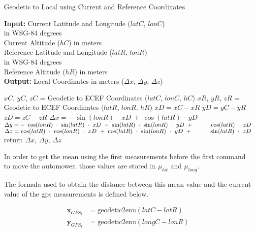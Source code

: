 \begin{algorithm}[H]
\caption{Geodetic to Local using Current and Reference Coordinates}
\label{alg:local}
    \hspace*{\algorithmicindent} \textbf{Input:} Current Latitude and Longitude ($latC$, $lonC$)\\
        \hspace*{5em} in WSG-84 degrees\\
    \hspace*{4em} Current Altitude ($hC$) in meters\\
    \hspace*{4em} Reference Latitude and Longitude ($latR$, $lonR$)\\
        \hspace*{5em} in WSG-84 degrees\\
    \hspace*{4em} Reference Altitude ($hR$) in meters \\
    \hspace*{\algorithmicindent} \textbf{Output:} Local Coordinates in meters ($\Delta x$, $\Delta y$, $\Delta z$)
  \begin{algorithmic}[1]
    \STATE $xC$, $yC$, $zC$ = Geodetic to ECEF Coordinates ($latC$, $lonC$, $hC$)
    \STATE $xR$, $yR$, $zR$ = Geodetic to ECEF Coordinates ($latR$, $lonR$, $hR$)
    \STATE $xD = xC - xR$
    \STATE $yD = yC - yR$
    \STATE $zD = zC - zR$
    \STATE $\Delta x = -~\sin(lonR)~\cdot~xD~+~\cos(latR)~\cdot~yD$
    \STATE $\Delta y = -~\cos(lonR)~\cdot~\sin(latR)~\cdot~xD~-~\sin(latR)~\cdot~\sin(lonR)~\cdot~yD~+ \hspace*{3em} \cos(latR)~\cdot~zD$
    \STATE $\Delta z = \cos(latR)~\cdot~\cos(lonR)~\cdot~xD~+~\cos(latR)~\cdot~\sin(lonR)~\cdot~yD~+  \hspace*{3em} \sin(latR)~\cdot~zD$
    \STATE return $\Delta x$, $\Delta y$, $\Delta z$
    \end{algorithmic}

\end{algorithm}

In order to get the mean using the first measurements before the first command to move the automower, those values are stored in $\mu_{lat}$ and $\mu_{long}$.

The formula used to obtain the distance between this mean value and the current value of the gps measurements is defined below.

\begin{align}
\mathbf{x}_{GPS_t} & = \text{geodetic2enu}( latC - latR)\\
\mathbf{y}_{GPS_t} & = \text{geodetic2enu}( longC - lonR)
\end{align}

